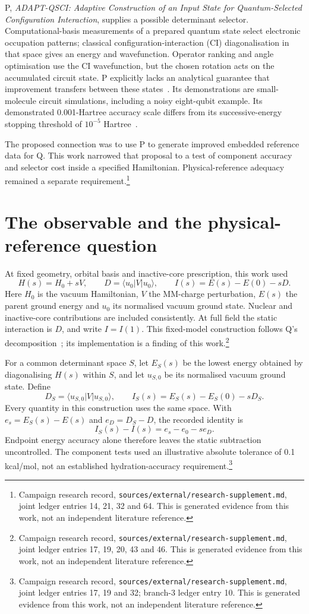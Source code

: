 \documentclass{article}
\newcommand{\record}[1]{\footnote{Campaign research record, \texttt{sources/external/research-supplement.md}, #1. This is generated evidence from this work, not an independent literature reference.}}
\begin{document}
P, \emph{ADAPT-QSCI: Adaptive Construction of an Input State for Quantum-Selected Configuration Interaction}, supplies a possible determinant selector. Computational-basis measurements of a prepared quantum state select electronic occupation patterns; classical configuration-interaction (CI) diagonalisation in that space gives an energy and wavefunction. Operator ranking and angle optimisation use the CI wavefunction, but the chosen rotation acts on the accumulated circuit state. P explicitly lacks an analytical guarantee that improvement transfers between these states~\cite{P}. Its demonstrations are small-molecule circuit simulations, including a noisy eight-qubit example. Its demonstrated 0.001-Hartree accuracy scale differs from its successive-energy stopping threshold of \(10^{-5}\) Hartree~\cite{P}.

The proposed connection was to use P to generate improved embedded reference data for Q. This work narrowed that proposal to a test of component accuracy and selector cost inside a specified Hamiltonian. Physical-reference adequacy remained a separate requirement.\record{joint ledger entries 14, 21, 32 and 64}

\section{The observable and the physical-reference question}
At fixed geometry, orbital basis and inactive-core prescription, this work used
\[
 H(s)=H_0+sV,\qquad
 D=\langle u_0|V|u_0\rangle,\qquad
 I(s)=E(s)-E(0)-sD.
\]
Here \(H_0\) is the vacuum Hamiltonian, \(V\) the MM-charge perturbation, \(E(s)\) the parent ground energy and \(u_0\) its normalised vacuum ground state. Nuclear and inactive-core contributions are included consistently. At full field the static interaction is \(D\), and write \(I=I(1)\). This fixed-model construction follows Q's decomposition~\cite{Q}; its implementation is a finding of this work.\record{joint ledger entries 17, 19, 20, 43 and 46}

For a common determinant space \(S\), let \(E_S(s)\) be the lowest energy obtained by diagonalising \(H(s)\) within \(S\), and let \(u_{S,0}\) be its normalised vacuum ground state. Define
\[
 D_S=\langle u_{S,0}|V|u_{S,0}\rangle,\qquad
 I_S(s)=E_S(s)-E_S(0)-sD_S.
\]
Every quantity in this construction uses the same space. With \(e_s=E_S(s)-E(s)\) and \(e_D=D_S-D\), the recorded identity is
\[
 I_S(s)-I(s)=e_s-e_0-se_D.
\]
Endpoint energy accuracy alone therefore leaves the static subtraction uncontrolled. The component tests used an illustrative absolute tolerance of 0.1 kcal/mol, not an established hydration-accuracy requirement.\record{joint ledger entries 17, 19 and 32; branch-3 ledger entry 10}
\end{document}
